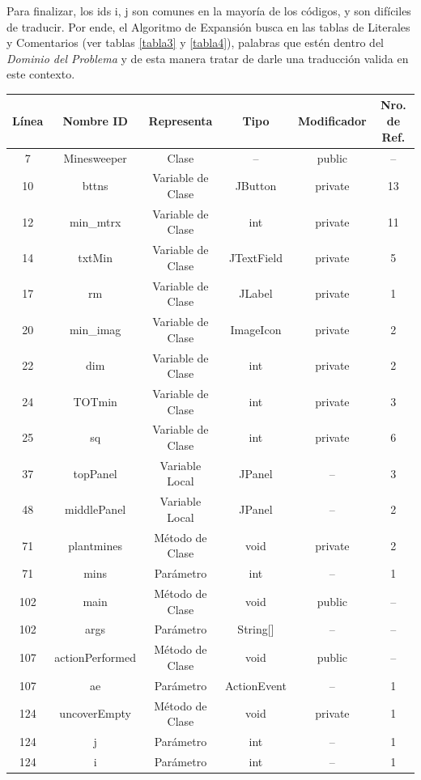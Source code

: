 Para finalizar, los ids  \textsf{i}, \textsf{j} son comunes en la mayoría de los códigos, y son difíciles de traducir. Por ende, el Algoritmo de Expansión busca en las tablas de Literales y Comentarios  (ver tablas \ref{tabla3} y \ref{tabla4}), palabras que estén dentro del \textit{Dominio del Problema} y de esta manera tratar de darle una traducción valida en este contexto.

\begin{table}
\centering
	\begin{tabular}{| c | c | c | c | c | c | }      
       \hline
  	   \textbf{Línea} & \textbf{Nombre ID} & \textbf{Representa} & \textbf{Tipo} & \textbf{Modificador} & \textbf{Nro. de Ref.}\\ \hline
7&Minesweeper&Clase&--&public&-- \\ \hline  	   
10&bttns&Variable de Clase&JButton&private&13\\ \hline
12&min\_mtrx&Variable de Clase&int&private&11\\ \hline
14&txtMin&Variable de Clase&JTextField&private&5\\ \hline
17&rm&Variable de Clase&JLabel&private&1\\ \hline
20&min\_imag&Variable de Clase&ImageIcon&private&2\\ \hline
22&dim&Variable de Clase&int&private&2 \\ \hline
24&TOTmin&Variable de Clase&int&private&3\\ \hline
25&sq&Variable de Clase&int&private&6\\ \hline
37&topPanel&Variable Local&JPanel&--&3\\ \hline
48&middlePanel&Variable Local&JPanel&--&2\\ \hline
71&plantmines&Método de Clase&void&private&2\\ \hline
71&mins&Parámetro&int&--&1\\ \hline
102&main&Método de Clase&void&public&-- \\ \hline
102&args&Parámetro&String[]&--&-- \\ \hline
107&actionPerformed&Método de Clase&void&public&-- \\ \hline
107&ae&Parámetro&ActionEvent&--&1\\ \hline
124&uncoverEmpty&Método de Clase&void&private&1\\ \hline
124&j&Parámetro&int&--&1\\ \hline
124&i&Parámetro&int&--&1\\ \hline

\end{tabular}
\end{table}
